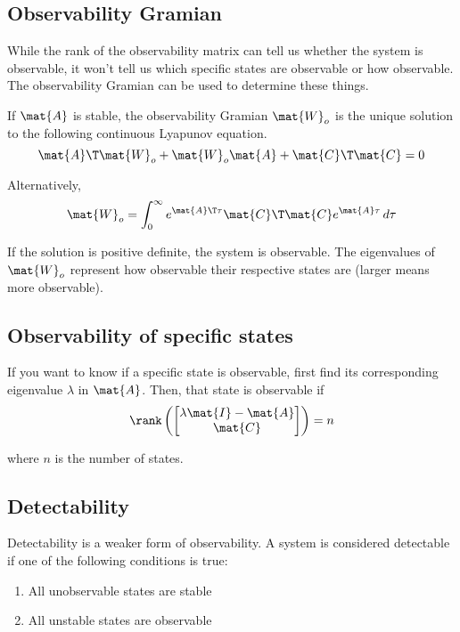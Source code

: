 \subsection{Observability Gramian}

While the rank of the observability matrix can tell us whether the system is
observable, it won't tell us which specific states are observable or how
observable. The observability Gramian can be used to determine these things.

If $\mat{A}$ is stable, the observability Gramian $\mat{W}_o$ is the unique
solution to the following continuous Lyapunov equation.
\begin{equation}
  \mat{A}\T\mat{W}_o + \mat{W}_o\mat{A} + \mat{C}\T\mat{C} = 0
\end{equation}

Alternatively,
\begin{equation}
  \mat{W}_o =
    \int_0^\infty e^{\mat{A}\T\tau} \mat{C}\T\mat{C} e^{\mat{A}\tau} \,d\tau
\end{equation}

If the solution is positive definite, the system is observable. The eigenvalues
of $\mat{W}_o$ represent how observable their respective states are (larger
means more observable).

\subsection{Observability of specific states}

If you want to know if a specific state is observable, first find its
corresponding eigenvalue $\lambda$ in $\mat{A}$. Then, that state is
observable if
\begin{equation}
  \rank\left(
  \begin{bmatrix}
    \lambda\mat{I} - \mat{A} \\
    \mat{C}
  \end{bmatrix}\right) = n
\end{equation}

where $n$ is the number of \glspl{state}.

\subsection{Detectability}

Detectability is a weaker form of observability. A system is considered
detectable if one of the following conditions is true:
\begin{enumerate}
  \item All unobservable states are stable
  \item All unstable states are observable
\end{enumerate}
